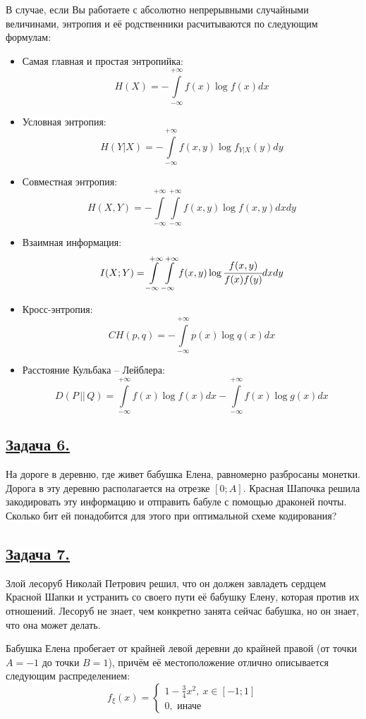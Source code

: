 В случае, если Вы работаете с абсолютно непрерывными случайными величинами, энтропия и её родственники расчитываются по следующим формулам:
\begin{itemize}
    \item Самая главная и простая энтропийка:
    \[H(X)=-\int\limits_{-\infty}^{+\infty} f(x)\log f(x)dx \]
    \item Условная энтропия:
    \[H(Y|X)=-\int\limits_{-\infty}^{+\infty} f(x, y)\log f_{Y|X}(y)dy \]
    \item Совместная энтропия:
    \[H(X, Y)=-\int\limits_{-\infty}^{+\infty} \int\limits_{-\infty}^{+\infty} f(x, y)\log f(x, y)dxdy \]
    \item Взаимная информация:
    \[I(X; Y)=\int\limits_{-\infty}^{+\infty} \int\limits_{-\infty}^{+\infty} f(x, y) \log \cfrac{f(x, y)}{f(x)f(y)}dxdy \]
    \item Кросс-энтропия:
    \[CH(p, q)=-\int\limits_{-\infty}^{+\infty}p(x)\log q(x) dx \]
    \item Расстояние Кульбака -- Лейблера:
    \[D(P\, ||\, Q)=\int\limits_{-\infty}^{+\infty} f(x)\log f(x)dx -\int\limits_{-\infty}^{+\infty} f(x)\log g(x)dx  \]
\end{itemize}

\subsection*{\hyperref[sec:sol_problem6]{Задача 6.}}\label{sec:problem6} На дороге в деревню, где живет бабушка Елена, равномерно разбросаны монетки. Дорога в эту деревню располагается на отрезке $[0; A]$. Красная Шапочка решила закодировать эту информацию и отправить бабуле с помощью драконей почты. Сколько бит ей понадобится для этого при оптимальной схеме кодирования?

\subsection*{\hyperref[sec:sol_problem7]{Задача 7.}}\label{sec:problem7} Злой лесоруб Николай Петрович решил, что он должен завладеть сердцем Красной Шапки и устранить со своего пути её бабушку Елену, которая против их отношений. Лесоруб не знает, чем конкретно занята сейчас бабушка, но он знает, что она может делать.

Бабушка Елена пробегает от крайней левой деревни до крайней правой (от точки $A=-1$ до точки $B=1$), причём её местоположение отлично описывается следующим распределением:\[f_{\xi}(x)=\begin{cases}
    1-\frac{3}{4}x^2, \ x\in [-1; 1] \\
    0, \text{ иначе}
\end{cases} \]

